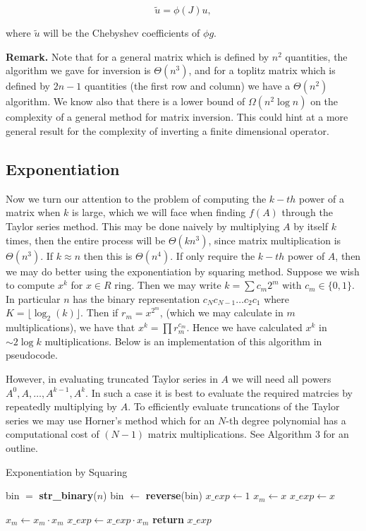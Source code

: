 \documentclass{article}
\begin{document}
 $$ \tilde{u} = \phi(J)u, $$

 where $\tilde{u}$ will be the Chebyshev coefficients of $\phi g$.

 \textbf{Remark.} Note that for a general matrix which is defined by $n^2$ quantities, the algorithm we gave for inversion is $\Theta(n^3)$, and for a toplitz matrix which is defined by $2n-1$ quantities (the first row and column) we have a $\Theta(n^2)$ algorithm. We know also that there is a lower bound of $\Omega(n^2\log n)$ on the complexity of a general method for matrix inversion.\autocite{tveit2003complexity} This could hint at a more general result for the complexity of inverting a finite dimensional operator.


\subsection{Exponentiation}
Now we turn our attention to the problem of computing the $k-th$ power of a matrix when $k$ is large, which we will face when finding $f(A)$ through the Taylor series method. This may be done naively by multiplying $A$ by itself $k$ times, then the entire process will be $\Theta(kn^3)$, since matrix multiplication is $\Theta(n^3)$. If $k \approx n$ then this is $\Theta(n^4)$. If only require the $k-th$ power of $A$, then we may do better using the exponentiation by squaring method. Suppose we wish to compute $x^k$ for $x \in R$ ring. Then we may write $k = \sum c_m2^m$ with $c_m \in \{0,1\}$. In particular $n$ has the binary representation $c_Nc_{N-1}\ldots c_2c_1$ where $K = \lfloor \log_2(k) \rfloor$. Then if $r_m = x^{2^m}$, (which we may calculate in $m$ multiplications), we have that $x^k = \prod r_m^{c_m}$. Hence we have calculated $x^k$ in $\sim 2\log k$ multiplications. Below is an implementation of this algorithm in pseudocode.

However, in evaluating truncated Taylor series in $A$ we will need all powers $A^0, A, \ldots, A^{k-1}, A^k$. In such a case it is best to evaluate the required matrcies by repeatedly multiplying by $A$. To efficiently evaluate truncations of the Taylor series we may use Horner's method which for an $N$-th degree polynomial has a computational cost of $(N-1)$ matrix multiplications.\autocite{Higham} See Algorithm 3 for an outline.

\begin{algorithm}\caption{Exponentiation by Squaring}\label{exp_sqr}\begin{algorithmic}[1]
    \State bin $=$ \textbf{str\_binary}($n$) 
    \State bin $\gets$ \textbf{reverse}(bin)     
    \State $x\_exp \gets 1$
    \State $x_m \gets x$
        \State $x\_exp \gets x$
    \EndIf

        \State $x_m \gets x_m \cdot x_m$
            \State $x\_exp \gets x\_exp\cdot x_m$
        \EndIf
    \EndFor
    \State \textbf{return} $x\_exp$
    \EndProcedure
\end{algorithmic}
\end{algorithm}
\end{document}
